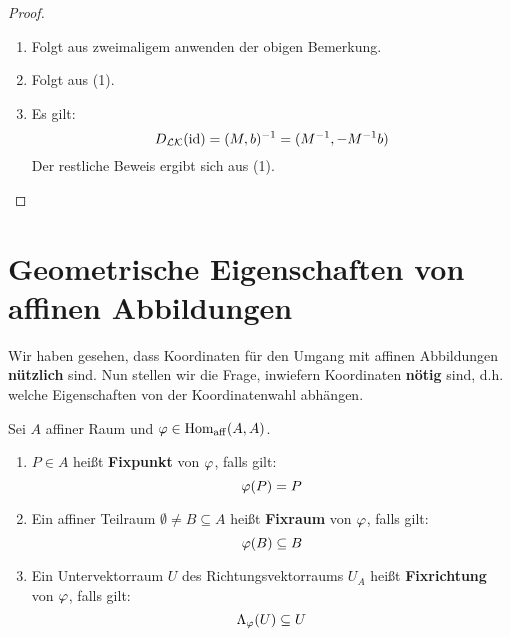 \documentclass[parskip,a4paper,twoside,DIV15,BCOR12mm]{scrbook}
\begin{document}
\begin{proof}
\begin{enumerate}
\item Folgt aus zweimaligem anwenden der obigen Bemerkung.
\item Folgt aus (1).
\item Es gilt:
\[D_{\mathcal{LK}}(\operatorname{id})=(M,b)^{-1}=(M^{-1},-M^{-1}b)\]
Der restliche Beweis ergibt sich aus (1).
\end{enumerate}
\end{proof}

\section{Geometrische Eigenschaften von affinen Abbildungen}
Wir haben gesehen, dass Koordinaten für den Umgang mit affinen Abbildungen \textbf{nützlich}
sind. Nun stellen wir die Frage, inwiefern Koordinaten \textbf{nötig} sind, d.h.
welche Eigenschaften von der Koordinatenwahl abhängen.

\begin{definition}
Sei $A$ affiner Raum und $\varphi\in\operatorname{Hom_{aff}}(A,A)$.
\begin{enumerate}
\item $P\in A$ heißt \textbf{Fixpunkt} von $\varphi$, falls gilt:
\[\varphi(P)=P\]
\item Ein affiner Teilraum $\emptyset\ne B\subseteq A$ heißt \textbf{Fixraum} 
von $\varphi$, falls gilt:
\[\varphi(B)\subseteq B\]
\item Ein Untervektorraum $U$ des Richtungsvektorraums $U_A$ heißt \textbf{Fixrichtung}
von $\varphi$, falls gilt:
\[\Lambda_\varphi(U)\subseteq U\]
\end{enumerate}
\end{definition}
\end{document}
